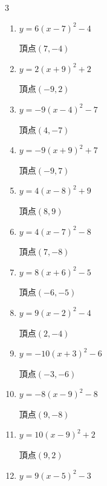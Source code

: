 \begin{multicols}{3}
\begin{enumerate}
  \item $\displaystyle y=6\left( x-7\right)^{2}-4$

        $\displaystyle 頂点\left( 7 , -4 \right)$

  \item $\displaystyle y=2\left( x+9\right)^{2}+2$

        $\displaystyle 頂点\left( -9 , 2 \right)$

  \item $\displaystyle y=-9\left( x-4\right)^{2}-7$

        $\displaystyle 頂点\left( 4 , -7 \right)$

  \item $\displaystyle y=-9\left( x+9\right)^{2}+7$

        $\displaystyle 頂点\left( -9 , 7 \right)$

  \item $\displaystyle y=4\left( x-8\right)^{2}+9$

        $\displaystyle 頂点\left( 8 , 9 \right)$

\columnbreak %

\resetques

  \item $\displaystyle y=4\left( x-7\right)^{2}-8$

        $\displaystyle 頂点\left( 7 , -8 \right)$

  \item $\displaystyle y=8\left( x+6\right)^{2}-5$

        $\displaystyle 頂点\left( -6 , -5 \right)$

  \item $\displaystyle y=9\left( x-2\right)^{2}-4$

        $\displaystyle 頂点\left( 2 , -4 \right)$

  \item $\displaystyle y=-10\left( x+3\right)^{2}-6$

        $\displaystyle 頂点\left( -3 , -6 \right)$

  \item $\displaystyle y=-8\left( x-9\right)^{2}-8$

        $\displaystyle 頂点\left( 9 , -8 \right)$

  \item $\displaystyle y=10\left( x-9\right)^{2}+2$

        $\displaystyle 頂点\left( 9 , 2 \right)$

  \item $\displaystyle y=9\left( x-5\right)^{2}-3$


\end{enumerate}
\end{multicols}
